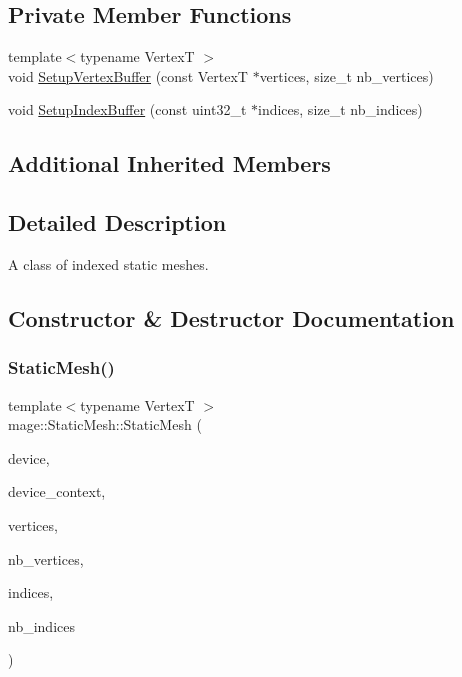 \subsection*{Private Member Functions}
\begin{DoxyCompactItemize}
\item 
{\footnotesize template$<$typename VertexT $>$ }\\void \hyperlink{classmage_1_1_static_mesh_a66d1b876d80987abec5f1e4db3edc9a2}{Setup\+Vertex\+Buffer} (const VertexT $\ast$vertices, size\+\_\+t nb\+\_\+vertices)
\item 
void \hyperlink{classmage_1_1_static_mesh_acebe0c6014932681b63109bc75754f87}{Setup\+Index\+Buffer} (const uint32\+\_\+t $\ast$indices, size\+\_\+t nb\+\_\+indices)
\end{DoxyCompactItemize}
\subsection*{Additional Inherited Members}


\subsection{Detailed Description}
A class of indexed static meshes. 

\subsection{Constructor \& Destructor Documentation}
\hypertarget{classmage_1_1_static_mesh_ab66b5c11fee10d2e7cbe8bdd4b45d6fe}{}\label{classmage_1_1_static_mesh_ab66b5c11fee10d2e7cbe8bdd4b45d6fe} 
\subsubsection{\texorpdfstring{Static\+Mesh()}{StaticMesh()}\hspace{0.1cm}{\footnotesize\ttfamily [1/4]}}
{\footnotesize\ttfamily template$<$typename VertexT $>$ \\
mage\+::\+Static\+Mesh\+::\+Static\+Mesh (\begin{DoxyParamCaption}\item[{I\+D3\+D11\+Device2 $\ast$}]{device,  }\item[{I\+D3\+D11\+Device\+Context2 $\ast$}]{device\+\_\+context,  }\item[{const VertexT $\ast$}]{vertices,  }\item[{size\+\_\+t}]{nb\+\_\+vertices,  }\item[{const uint32\+\_\+t $\ast$}]{indices,  }\item[{size\+\_\+t}]{nb\+\_\+indices }\end{DoxyParamCaption})\hspace{0.3cm}{\ttfamily [explicit]}}

